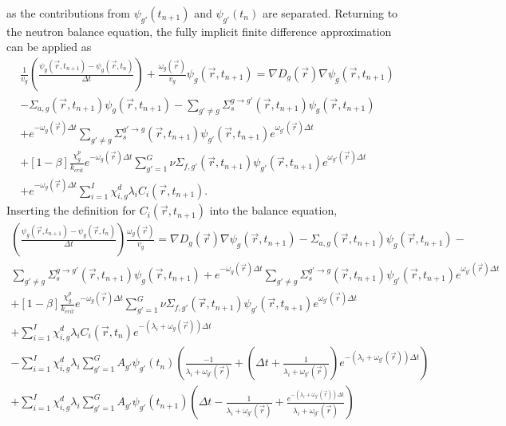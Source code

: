 \documentclass[12pt]{report}
\begin{document}
	as the contributions from $\psi_{g'}(t_{n+1})$ and $\psi_{g'}(t_{n})$ are separated. Returning to the neutron balance equation, the fully implicit finite difference approximation can be applied as
	\begin{eqnarray}
		 \frac{1}{v_g} \left(\frac{\psi_g(\vec{r},t_{n+1}) - \psi_g(\vec{r},t_{n})}{\Delta t} \right) + \frac{\omega_g(\vec{r})}{v_g} \psi_g(\vec{r},t_{n+1})  = \nabla D_g(\vec{r}) \nabla \psi_g(\vec{r},t_{n+1}) \nonumber \\ - \Sigma_{a,g}(\vec{r},t_{n+1}) \psi_g(\vec{r},t_{n+1}) - \sum_{g'\neq g} \Sigma_{s}^{g\rightarrow g'} (\vec{r},t_{n+1}) \psi_g(\vec{r},t_{n+1}) \nonumber \\ + e^{-\omega_g(\vec{r}) \Delta t} \sum_{g' \neq g} \Sigma_{s}^{g'\rightarrow g} (\vec{r},t_{n+1}) \psi_{g'}(\vec{r},t_{n+1}) e^{\omega_{g'}(\vec{r}) \Delta t} \nonumber \\
		+ \left[ 1- \beta \right] \frac{\chi_g^p}{k_{crit}} e^{-\omega_g(\vec{r}) \Delta t} \sum_{g'=1}^{G} \nu \Sigma_{f,g'}(\vec{r},t_{n+1}) \psi_{g'}(\vec{r},t_{n+1}) e^{\omega_{g'}(\vec{r}) \Delta t} \nonumber \\ + e^{-\omega_g(\vec{r}) \Delta t} \sum_{i=1}^{I} \chi_{i,g}^d \lambda_i C_i(\vec{r},t_{n+1}) \nonumber.
	\end{eqnarray}
	Inserting the definition for $C_i(\vec{r},t_{n+1})$ into the balance equation,
	\begin{eqnarray}
	\left(\frac{\psi_g(\vec{r},t_{n+1}) - \psi_g(\vec{r},t_{n})}{\Delta t} \right) \frac{\omega_g(\vec{r})}{v_g}  = \nabla D_g(\vec{r}) \nabla \psi_g(\vec{r},t_{n+1}) - \Sigma_{a,g}(\vec{r},t_{n+1}) \psi_g(\vec{r},t_{n+1}) -  \nonumber \\ \sum_{g'\neq g} \Sigma_{s}^{g\rightarrow g'} (\vec{r},t_{n+1}) \psi_g(\vec{r},t_{n+1}) + e^{-\omega_g(\vec{r}) \Delta t} \sum_{g' \neq g} \Sigma_{s}^{g'\rightarrow g} (\vec{r},t_{n+1}) \psi_{g'}(\vec{r},t_{n+1}) e^{\omega_{g'}(\vec{r}) \Delta t} \nonumber \\
	+ \left[ 1- \beta \right] \frac{\chi_g^p}{k_{crit}} e^{-\omega_g(\vec{r}) \Delta t} \sum_{g'=1}^{G} \nu \Sigma_{f,g'}(\vec{r},t_{n+1}) \psi_{g'}(\vec{r},t_{n+1}) e^{\omega_{g'}(\vec{r}) \Delta t} \nonumber \\ +  \sum_{i=1}^{I} \chi_{i,g}^d \lambda_i C_i(\vec{r},t_{n}) e^{-\left(\lambda_i + \omega_g(\vec{r})\right) \Delta t} \nonumber \\
	- \sum_{i=1}^{I} \chi_{i,g}^d \lambda_i \sum_{g'=1}^{G} A_{g'} \psi_{g'}(t_n) \left( \frac{-1}{\lambda_i + \omega_{g'}(\vec{r})} + \left(\Delta t + \frac{1}{\lambda_i + \omega_{g'}(\vec{r})} \right)e^{-\left(\lambda_i + \omega_{g'}(\vec{r}) \right) \Delta t} \right) \nonumber \\
	+ \sum_{i=1}^{I} \chi_{i,g}^d \lambda_i \sum_{g'=1}^{G} A_{g'} \psi_{g'}(t_{n+1}) \left( \Delta t - \frac{1}{\lambda_i + \omega_{g'}(\vec{r})} + \frac{e^{-\left( \lambda_i + \omega_{g'}(\vec{r}) \right) \Delta t}}{\lambda_i + \omega_{g'}(\vec{r})} \right)
	\nonumber
	\end{eqnarray}
\end{document}
